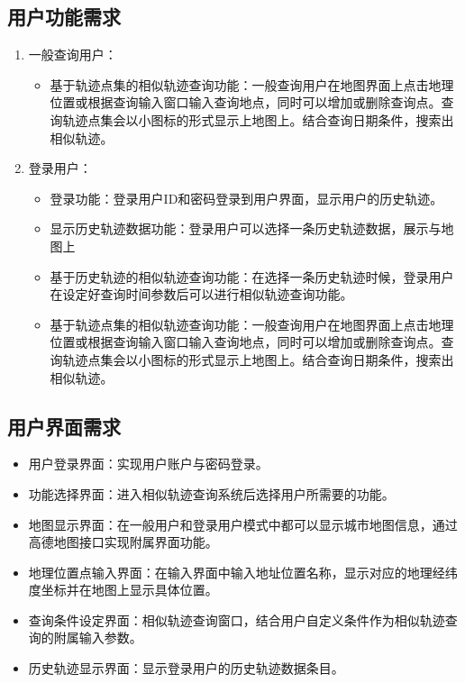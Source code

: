 \subsection{用户功能需求}
\label{subsec:user class functional requirements}
\begin{enumerate}
   \item 一般查询用户：
   \begin{itemize}
   		\item 基于轨迹点集的相似轨迹查询功能：一般查询用户在地图界面上点击地理位置或根据查询输入窗口输入查询地点，同时可以增加或删除查询点。查询轨迹点集会以小图标的形式显示上地图上。结合查询日期条件，搜索出相似轨迹。
   \end{itemize}
   \item 登录用户：
   \begin{itemize}
		\item 登录功能：登录用户ID和密码登录到用户界面，显示用户的历史轨迹。
		\item 显示历史轨迹数据功能：登录用户可以选择一条历史轨迹数据，展示与地图上
		\item 基于历史轨迹的相似轨迹查询功能：在选择一条历史轨迹时候，登录用户在设定好查询时间参数后可以进行相似轨迹查询功能。
		\item 基于轨迹点集的相似轨迹查询功能：一般查询用户在地图界面上点击地理位置或根据查询输入窗口输入查询地点，同时可以增加或删除查询点。查询轨迹点集会以小图标的形式显示上地图上。结合查询日期条件，搜索出相似轨迹。
   \end{itemize}
\end{enumerate}

\vspace{3mm}


\begin{figure}[!htp]
    \centering
    \resizebox{!}{!}{}
\end{figure}

\subsection{用户界面需求}
\label{subsec:external interface Requirements}
\begin{itemize}
	\item 用户登录界面：实现用户账户与密码登录。
	\item 功能选择界面：进入相似轨迹查询系统后选择用户所需要的功能。
	\item 地图显示界面：在一般用户和登录用户模式中都可以显示城市地图信息，通过高德地图\cite{AutoNavi}接口实现附属界面功能。
	\item 地理位置点输入界面：在输入界面中输入地址位置名称，显示对应的地理经纬度坐标并在地图上显示具体位置。
	\item 查询条件设定界面：相似轨迹查询窗口，结合用户自定义条件作为相似轨迹查询的附属输入参数。
	\item 历史轨迹显示界面：显示登录用户的历史轨迹数据条目。
\end{itemize}

